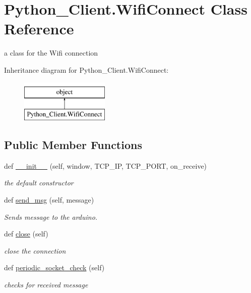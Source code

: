 \hypertarget{class_python___client_1_1_wifi_connect}{}\section{Python\+\_\+\+Client.\+Wifi\+Connect Class Reference}
\label{class_python___client_1_1_wifi_connect}


a class for the Wifi connection  


Inheritance diagram for Python\+\_\+\+Client.\+Wifi\+Connect\+:\begin{figure}[H]
\begin{center}
\leavevmode
\includegraphics[height=2.000000cm]{class_python___client_1_1_wifi_connect}
\end{center}
\end{figure}
\subsection*{Public Member Functions}
\begin{DoxyCompactItemize}
\item 
def \mbox{\hyperlink{class_python___client_1_1_wifi_connect_a5abd335772d88bbc04fee603eed75852}{\+\_\+\+\_\+init\+\_\+\+\_\+}} (self, window, T\+C\+P\+\_\+\+IP, T\+C\+P\+\_\+\+P\+O\+RT, on\+\_\+receive)
\begin{DoxyCompactList}\small\item\em the default constructor \end{DoxyCompactList}\item 
def \mbox{\hyperlink{class_python___client_1_1_wifi_connect_ad5bac3310c58f99485738c056718a3ca}{send\+\_\+msg}} (self, message)
\begin{DoxyCompactList}\small\item\em Sends message to the arduino. \end{DoxyCompactList}\item 
def \mbox{\hyperlink{class_python___client_1_1_wifi_connect_ac05ef987e930e48c8c5bb8056c2ca68b}{close}} (self)
\begin{DoxyCompactList}\small\item\em close the connection \end{DoxyCompactList}\item 
def \mbox{\hyperlink{class_python___client_1_1_wifi_connect_a6eb0999228a1fc0e8f76d7aad443b6c5}{periodic\+\_\+socket\+\_\+check}} (self)
\begin{DoxyCompactList}\small\item\em checks for received message \end{DoxyCompactList}\end{DoxyCompactItemize}
